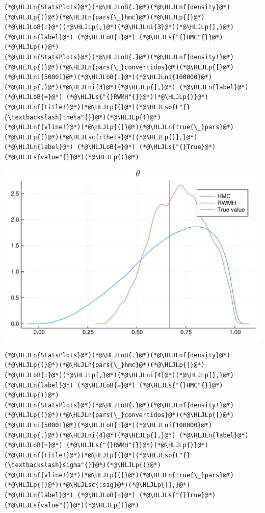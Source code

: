 \documentclass[12pt,a4paper]{article}
\newcommand{\HLJLn}[1]{#1}
\newcommand{\HLJLnf}[1]{\textcolor[RGB]{66,102,213}{#1}}
\newcommand{\HLJLs}[1]{\textcolor[RGB]{201,61,57}{#1}}
\newcommand{\HLJLsc}[1]{\textcolor[RGB]{201,61,57}{#1}}
\newcommand{\HLJLso}[1]{\textcolor[RGB]{201,61,57}{#1}}
\newcommand{\HLJLni}[1]{\textcolor[RGB]{59,151,46}{#1}}
\newcommand{\HLJLoB}[1]{\textcolor[RGB]{102,102,102}{\textbf{#1}}}
\newcommand{\HLJLp}[1]{#1}
\begin{document}
\begin{lstlisting}
(*@\HLJLn{StatsPlots}@*)(*@\HLJLoB{.}@*)(*@\HLJLnf{density}@*)(*@\HLJLp{(}@*)(*@\HLJLn{pars{\_}hmc}@*)(*@\HLJLp{[}@*)(*@\HLJLoB{:}@*)(*@\HLJLp{,}@*)(*@\HLJLni{3}@*)(*@\HLJLp{],}@*) (*@\HLJLn{label}@*) (*@\HLJLoB{=}@*) (*@\HLJLs{"{}HMC"{}}@*)(*@\HLJLp{)}@*)
(*@\HLJLn{StatsPlots}@*)(*@\HLJLoB{.}@*)(*@\HLJLnf{density!}@*)(*@\HLJLp{(}@*)(*@\HLJLn{pars{\_}convertidos}@*)(*@\HLJLp{[}@*)(*@\HLJLni{50001}@*)(*@\HLJLoB{:}@*)(*@\HLJLni{100000}@*)(*@\HLJLp{,}@*)(*@\HLJLni{3}@*)(*@\HLJLp{],}@*) (*@\HLJLn{label}@*) (*@\HLJLoB{=}@*) (*@\HLJLs{"{}RWMH"{}}@*)(*@\HLJLp{)}@*)
(*@\HLJLnf{title!}@*)(*@\HLJLp{(}@*)(*@\HLJLso{L"{}{\textbackslash}theta"{}}@*)(*@\HLJLp{)}@*)
(*@\HLJLnf{vline!}@*)(*@\HLJLp{([}@*)(*@\HLJLn{true{\_}pars}@*)(*@\HLJLp{[}@*)(*@\HLJLsc{:theta}@*)(*@\HLJLp{]],}@*) (*@\HLJLn{label}@*) (*@\HLJLoB{=}@*) (*@\HLJLs{"{}True}@*) (*@\HLJLs{value"{}}@*)(*@\HLJLp{)}@*)
\end{lstlisting}

\includegraphics[width=\linewidth]{figures/dsge_and_julia_46_1.pdf}

\begin{lstlisting}
(*@\HLJLn{StatsPlots}@*)(*@\HLJLoB{.}@*)(*@\HLJLnf{density}@*)(*@\HLJLp{(}@*)(*@\HLJLn{pars{\_}hmc}@*)(*@\HLJLp{[}@*)(*@\HLJLoB{:}@*)(*@\HLJLp{,}@*)(*@\HLJLni{4}@*)(*@\HLJLp{],}@*) (*@\HLJLn{label}@*) (*@\HLJLoB{=}@*) (*@\HLJLs{"{}HMC"{}}@*)(*@\HLJLp{)}@*)
(*@\HLJLn{StatsPlots}@*)(*@\HLJLoB{.}@*)(*@\HLJLnf{density!}@*)(*@\HLJLp{(}@*)(*@\HLJLn{pars{\_}convertidos}@*)(*@\HLJLp{[}@*)(*@\HLJLni{50001}@*)(*@\HLJLoB{:}@*)(*@\HLJLni{100000}@*)(*@\HLJLp{,}@*)(*@\HLJLni{4}@*)(*@\HLJLp{],}@*) (*@\HLJLn{label}@*) (*@\HLJLoB{=}@*) (*@\HLJLs{"{}RWMH"{}}@*)(*@\HLJLp{)}@*)
(*@\HLJLnf{title!}@*)(*@\HLJLp{(}@*)(*@\HLJLso{L"{}{\textbackslash}sigma"{}}@*)(*@\HLJLp{)}@*)
(*@\HLJLnf{vline!}@*)(*@\HLJLp{([}@*)(*@\HLJLn{true{\_}pars}@*)(*@\HLJLp{[}@*)(*@\HLJLsc{:sig}@*)(*@\HLJLp{]],}@*) (*@\HLJLn{label}@*) (*@\HLJLoB{=}@*) (*@\HLJLs{"{}True}@*) (*@\HLJLs{value"{}}@*)(*@\HLJLp{)}@*)
\end{lstlisting}
\end{document}
